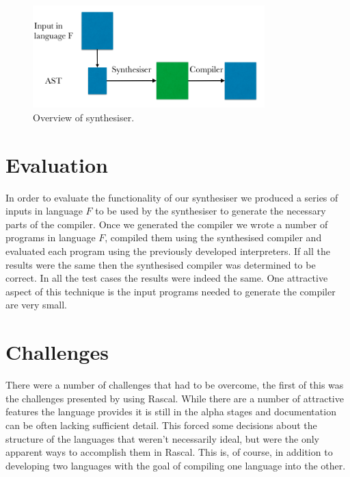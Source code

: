 \documentclass[twoside]{article}
\begin{document}
\begin{figure}[h]
  \includegraphics[width=0.8\textwidth]{images/synth.png}
  \caption{Overview of synthesiser.}
  \label{fig:synth}
\end{figure}

\section{Evaluation}
In order to evaluate the functionality of our synthesiser we produced
a series of inputs in language $F$ to be used by the synthesiser to
generate the necessary parts of the compiler. Once we generated the
compiler we wrote a number of programs in language $F$, compiled them
using the synthesised compiler and evaluated each program using the
previously developed interpreters. If all the results were the same
then the synthesised compiler was determined to be correct. In all the
test cases the results were indeed the same. One attractive aspect of
this technique is the input programs needed to generate the compiler
are very small. 

\section{Challenges}
There were a number of challenges that had to be overcome, the first
of this was the challenges presented by using Rascal. While there are
a number of attractive features the language provides it is still in
the alpha stages and documentation can be often lacking sufficient
detail. This forced some decisions about the structure of the
languages that weren't necessarily ideal, but were the only apparent
ways to accomplish them in Rascal. This is, of course, in addition to
developing two languages with the goal of compiling one language into
the other.
\end{document}
